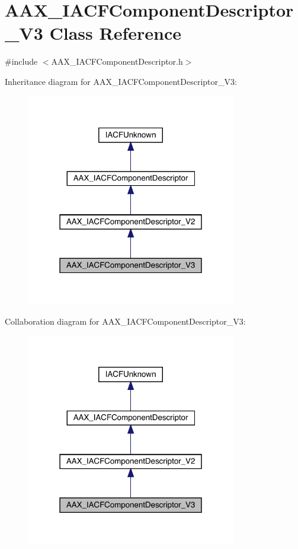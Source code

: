 \hypertarget{a01633}{}\section{A\+A\+X\+\_\+\+I\+A\+C\+F\+Component\+Descriptor\+\_\+\+V3 Class Reference}
\label{a01633}


{\ttfamily \#include $<$A\+A\+X\+\_\+\+I\+A\+C\+F\+Component\+Descriptor.\+h$>$}



Inheritance diagram for A\+A\+X\+\_\+\+I\+A\+C\+F\+Component\+Descriptor\+\_\+\+V3\+:
\nopagebreak
\begin{figure}[H]
\begin{center}
\leavevmode
\includegraphics[width=259pt]{a01632}
\end{center}
\end{figure}


Collaboration diagram for A\+A\+X\+\_\+\+I\+A\+C\+F\+Component\+Descriptor\+\_\+\+V3\+:
\nopagebreak
\begin{figure}[H]
\begin{center}
\leavevmode
\includegraphics[width=259pt]{a01631}
\end{center}
\end{figure}



